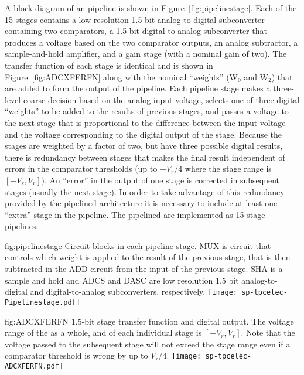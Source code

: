A block diagram of an  pipeline is shown in
Figure~\ref{fig:pipelinestage}. Each of the \num{15} stages contains a low-resolution
\num{1.5}-bit analog-to-digital subconverter containing two comparators, a
\num{1.5}-bit digital-to-analog subconverter that produces a voltage based on
the two comparator outputs, an analog subtractor, a sample-and-hold amplifier,
and a gain stage (with a nominal gain of two). The transfer function of
each stage is identical and is shown in Figure~\ref{fig:ADCXFERFN} along with
the nominal ``weights'' (W$_0$ and W$_2$) that are added to form the output of the
pipeline. Each pipeline stage makes a three-level coarse decision based on the
analog input voltage, selects one of three digital ``weights'' to be added to the
results of previous stages, and passes a voltage to the next stage that is
proportional to the difference between the input voltage and the voltage
corresponding to the digital output of the stage.  Because the stages are
weighted by a factor of two, but have three possible digital results, there is
redundancy between stages that makes the final result independent of errors in
the comparator thresholds (up to $\pm V_r/4$ where the stage range is
$[-V_r,V_r]$).  An ``error'' in the output of one stage is corrected in subsequent
stages (usually the next stage).  In order to take advantage of this redundancy
provided by the pipelined architecture it is necessary to include at least one
``extra'' stage in the pipeline.  The  pipelined  are
implemented as \num{15}-stage pipelines.

\begin{dunefigure}
{fig:pipelinestage}
{Circuit blocks in each  pipeline stage. MUX is circuit that controls
which weight is applied to the result of the previous stage, that is then subtracted
in the ADD circuit from the input of the previous stage. SHA is a sample and hold and
ADCS and DASC are low resolution 1.5 bit analog-to-digital and digital-to-analog 
subconverters, respectively.}
\texttt{[image: sp-tpcelec-Pipelinestage.pdf]}
\end{dunefigure}

\begin{dunefigure}
{fig:ADCXFERFN}
{\num{1.5}-bit stage transfer function and digital output. The voltage 
range of the  as a whole, and of each individual stage 
is $[-V_r,V_r]$.  Note that the voltage passed to the subsequent 
stage will not exceed the stage range even if a comparator threshold 
is wrong by up to $V_r/4$.}
\texttt{[image: sp-tpcelec-ADCXFERFN.pdf]}
\end{dunefigure}

